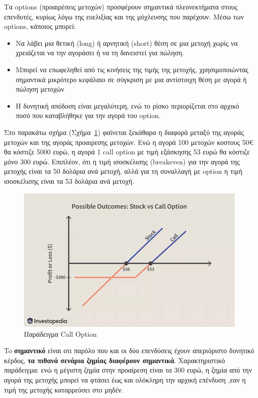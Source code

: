 Τα options (προαιρέσεις μετοχών) προσφέρουν σημαντικά πλεονεκτήματα στους επενδυτές, κυρίως λόγω της ευελιξίας και της μόχλευσης που παρέχουν.
Μέσω των options, κάποιος μπορεί:	
\begin{itemize}
    \item Να λάβει μια θετική (long) ή αρνητική (short) θέση σε μια μετοχή χωρίς να χρειάζεται να την αγοράσει ή να τη δανειστεί για πώληση.
    \item Μπορεί να επωφεληθεί από τις κινήσεις της τιμής της μετοχής, χρησιμοποιώντας σημαντικά μικρότερο κεφάλαιο σε σύγκριση με μια αντίστοιχη θέση με αγορά ή πώληση μετοχών
    \item Η δυνητική απόδοση είναι μεγαλύτερη, ενώ το ρίσκο περιορίζεται στο αρχικό ποσό που καταβλήθηκε για την αγορά του option.
\end{itemize}

Στο παρακάτω σχήμα (Σχήμα~\ref{fig:call_option})  φαίνεται ξεκάθαρα η διαφορά μεταξύ της αγοράς μετοχών και της αγοράς προαιρεσης μετοχών.
Ενώ η αγορά 100 μετοχών κοστους 50€ θα κόστιζε 5000 ευρώ, η αγορά 1 call option με τιμή εξάσκησης 53 ευρώ θα κόστιζε μόνο 300 ευρώ.
Επιπλέον, ότι η τιμή ισοσκέλισης (breakeven) για την αγορά της μετοχής είναι τα 50 δολάρια ανά μετοχή, αλλά για τη συναλλαγή με option 
η τιμή ισοσκέλισης είναι τα 53 δολάρια ανά μετοχή.
\begin{figure}[H]
    \centering
    \includegraphics[width=1.0\textwidth]{figures/call_option.png}
    \caption{Παράδειγμα Call Option}
    \label{fig:call_option}
\end{figure}

To \textbf{σημαντικό} είναι οτι παρόλο που και οι δύο επενδύσεις έχουν απεριόριστο δυνητικό κέρδος, \textbf{τα πιθανά σενάρια ζημίας διαφέρουν σημαντικά}.
Χαρακτηριστικό παράδειγμα: ενώ η μέγιστη ζημία στην προαίρεση είναι τα 300 ευρώ, η ζημία από την αγορά της μετοχής μπορεί να φτάσει έως και ολόκληρη την αρχική επένδυση ,εαν η τιμή της μετοχής καταρρεύσει στο μηδέν.

